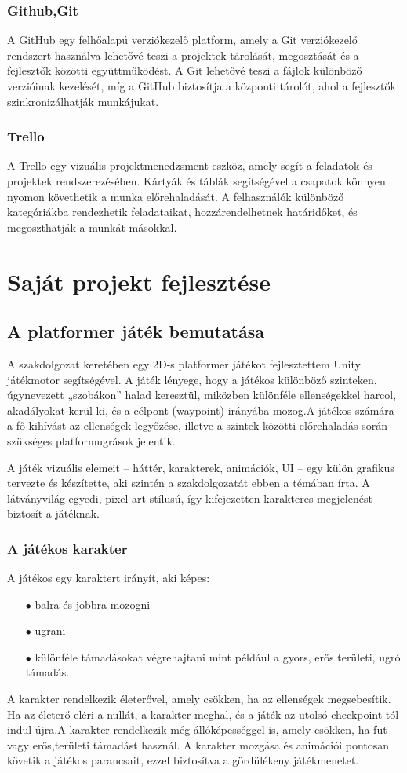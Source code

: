 \documentclass[
]{thesis-ekf}
\theoremstyle{definition}
\theoremstyle{remark}
\begin{document}
\subsection{Github,Git}
A GitHub egy felhőalapú verziókezelő platform, amely a Git verziókezelő rendszert használva lehetővé teszi a projektek tárolását, megosztását és a fejlesztők közötti együttműködést. A Git lehetővé teszi a fájlok különböző verzióinak kezelését, míg a GitHub biztosítja a központi tárolót, ahol a fejlesztők szinkronizálhatják munkájukat.\cite{GithubAndGit}
\subsection{Trello}
A Trello egy vizuális projektmenedzsment eszköz, amely segít a feladatok és projektek rendszerezésében. Kártyák és táblák segítségével a csapatok könnyen nyomon követhetik a munka előrehaladását. A felhasználók különböző kategóriákba rendezhetik feladataikat, hozzárendelhetnek határidőket, és megoszthatják a munkát másokkal.\cite{Trello}


\chapter{Saját projekt fejlesztése}
\section{A platformer játék bemutatása}
A szakdolgozat keretében egy 2D-s platformer játékot fejlesztettem Unity játékmotor segítségével. A játék lényege, hogy a játékos különböző szinteken, úgynevezett „szobákon” halad keresztül, miközben különféle ellenségekkel harcol, akadályokat kerül ki, és a célpont (waypoint) irányába mozog.A játékos számára a fő kihívást az ellenségek legyőzése, illetve a szintek közötti előrehaladás során szükséges platformugrások jelentik.

A játék vizuális elemeit – háttér, karakterek, animációk, UI – egy külön grafikus tervezte és készítette, aki szintén a szakdolgozatát ebben a témában írta. A látványvilág egyedi, pixel art stílusú, így kifejezetten karakteres megjelenést biztosít a játéknak.
\subsection{A játékos karakter}
A játékos egy karaktert irányít, aki képes:
\begin{itemize}
	\item[$\bullet$] balra és jobbra mozogni
	\item[$\bullet$] ugrani
	\item[$\bullet$] különféle támadásokat végrehajtani mint például a gyors, erős területi, ugró támadás.
\end{itemize}
A karakter rendelkezik életerővel, amely csökken, ha az ellenségek megsebesítik. Ha az életerő eléri a nullát, a karakter meghal, és a játék az utolsó checkpoint-tól indul újra.A karakter rendelkezik még állóképességgel is, amely csökken, ha fut vagy erős,területi támadást használ.
A karakter mozgása és animációi pontosan követik a játékos parancsait, ezzel biztosítva a gördülékeny játékmenetet.
\end{document}
